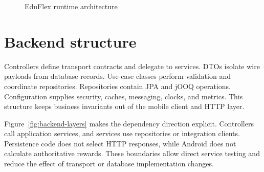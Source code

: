 \documentclass[12pt,a4paper,oneside]{report}
\begin{document}
\systemcontextdiagram

\begin{figure}[H]\centering
{}
\caption{EduFlex runtime architecture}\label{fig:architecture}
\end{figure}

\section{Backend structure}
Controllers define transport contracts and delegate to services. DTOs isolate wire
payloads from database records. Use-case classes perform validation and coordinate
repositories. Repositories contain JPA and jOOQ operations. Configuration supplies
security, caches, messaging, clocks, and metrics. This structure keeps business
invariants out of the mobile client and HTTP layer.

Figure~\ref{fig:backend-layers} makes the dependency direction explicit. Controllers
call application services, and services use repositories or integration clients.
Persistence code does not select HTTP responses, while Android does not calculate
authoritative rewards. These boundaries allow direct service testing and reduce the
effect of transport or database implementation changes.

\backendlayersdiagram
\end{document}
